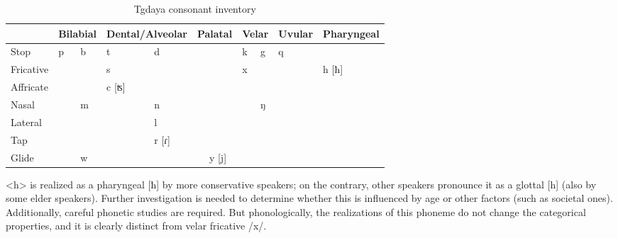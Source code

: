 \begin{table}[!htbp]
\centering
\caption{Tgdaya consonant inventory\\}
\label{tab:tgC}
\begin{tabular}{l|ll|ll|ll|ll|ll|ll}
\hline
                    & \multicolumn{2}{c|}{Bilabial} & \multicolumn{2}{c|}{Dental/Alveolar} & \multicolumn{2}{c|}{Palatal} & \multicolumn{2}{c|}{Velar} & \multicolumn{2}{c|}{Uvular} & \multicolumn{2}{c}{Pharyngeal} \\ \hline
Stop                & p            & b           & t               & d               &             &               & k          & g          & q            &            &                 &              \\
Fricative           &               &              & s               &                  &             &               & x          &             &               &            & h [ħ]             &              \\
Affricate           &               &              & c [ʦ]              &                  &             &               &             &             &               &            &                 &              \\
Nasal               &               & m           &                  & n               &             &               &             & ŋ          &               &            &                 &              \\
Lateral &               &              &                  & l               &             &               &             &             &               &            &                 &              \\
Tap                 &               &              &                  & r [ɾ]              &             &               &             &             &               &            &                 &              \\
Glide               &               & w           &                  &                  &             & y [j]           &             &             &               &            &                 &              \\ \hline
\end{tabular}
\end{table}

<h> is realized as a pharyngeal [ħ] by more conservative speakers; on the contrary, other speakers pronounce it as a glottal [h] (also by some elder speakers). Further investigation is needed to determine whether this is influenced by age or other factors (such as societal ones). Additionally, careful phonetic studies are required. But phonologically, the realizations of this phoneme do not change the categorical properties, and it is clearly distinct from velar fricative /x/.

